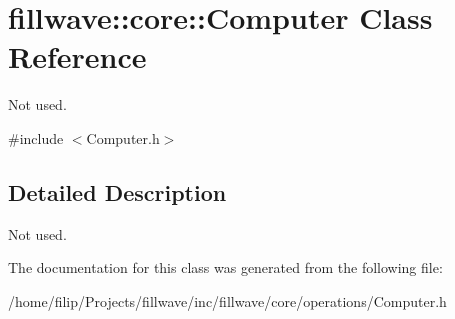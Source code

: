 \hypertarget{classfillwave_1_1core_1_1Computer}{}\section{fillwave\+:\+:core\+:\+:Computer Class Reference}
\label{classfillwave_1_1core_1_1Computer}


Not used.  




{\ttfamily \#include $<$Computer.\+h$>$}



\subsection{Detailed Description}
Not used. 

The documentation for this class was generated from the following file\+:\begin{DoxyCompactItemize}
\item 
/home/filip/\+Projects/fillwave/inc/fillwave/core/operations/Computer.\+h\end{DoxyCompactItemize}
